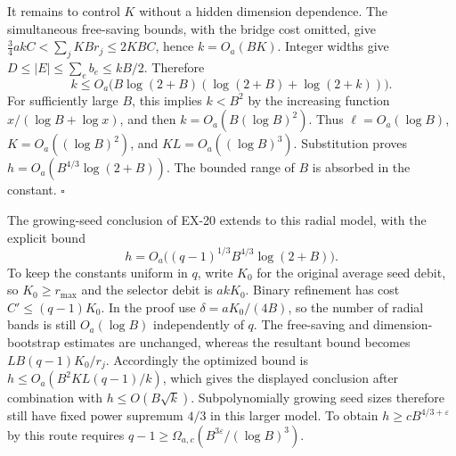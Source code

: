 It remains to control $K$ without a hidden dimension dependence.
The simultaneous free-saving bounds, with the bridge cost omitted,
give $\tfrac34akC<\sum_jKBr_j\leq2KBC$, hence
$k=O_a(BK)$. Integer widths give
$D\leq|E|\leq\sum_e b_e\leq kB/2$. Therefore
\[
 k\leq O_a\bigl(B\log(2+B)
              (\log(2+B)+\log(2+k))\bigr).
\]
For sufficiently large $B$, this implies $k<B^2$ by the increasing
function $x/(\log B+\log x)$, and then
$k=O_a(B(\log B)^2)$. Thus
$\ell=O_a(\log B)$, $K=O_a((\log B)^2)$, and
$KL=O_a((\log B)^3)$. Substitution proves
$h=O_a(B^{4/3}\log(2+B))$. The bounded range of $B$ is absorbed
in the constant. \hfill$\square$

The growing-seed conclusion of EX-20 extends to this radial model,
with the explicit bound
\[
 h=O_a\bigl((q-1)^{1/3}B^{4/3}\log(2+B)\bigr).
\]
To keep the constants uniform in $q$, write $K_0$ for the original
average seed debit, so $K_0\geq r_{\max}$ and the selector debit is
$akK_0$. Binary refinement has cost $C'\leq(q-1)K_0$.
In the proof use $\delta=aK_0/(4B)$, so the number of radial bands
is still $O_a(\log B)$ independently of $q$. The free-saving and
dimension-bootstrap estimates are unchanged, whereas the resultant
bound becomes $LB(q-1)K_0/r_j$. Accordingly the optimized bound is
$h\leq O_a(B^2KL(q-1)/k)$, which gives the displayed conclusion
after combination with $h\leq O(B\sqrt k)$.
Subpolynomially growing seed sizes therefore still have fixed power
supremum $4/3$ in this larger model. To obtain
$h\geq cB^{4/3+\varepsilon}$ by this route requires
$q-1\geq\Omega_{a,c}(B^{3\varepsilon}/(\log B)^3)$.

